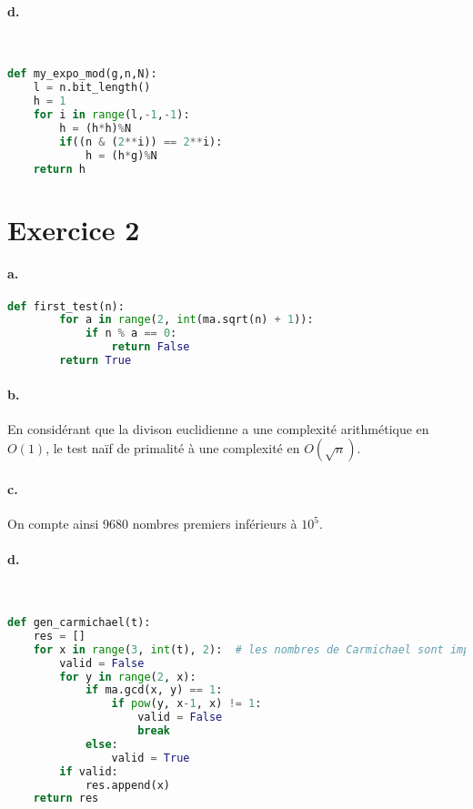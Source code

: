 \documentclass[french]{article}
\begin{document}
\paragraph{d.} \
\begin{lstlisting}[language=Python, belowskip=-1 \baselineskip]
def my_expo_mod(g,n,N):
    l = n.bit_length()
    h = 1
    for i in range(l,-1,-1):
        h = (h*h)%N
        if((n & (2**i)) == 2**i):
            h = (h*g)%N
    return h
\end{lstlisting}
\section*{Exercice 2}
\paragraph{a.}  
\begin{center}
\begin{lstlisting}[language=Python, belowskip=-1 \baselineskip]
    def first_test(n):
        for a in range(2, int(ma.sqrt(n) + 1)):
            if n % a == 0:
                return False
        return True
\end{lstlisting}
\end{center}
\paragraph{b.} En considérant que la divison euclidienne a une complexité arithmétique en $O(1)$, le test naïf de primalité à une complexité en $O(\sqrt{n})$.
\paragraph{c.} On compte ainsi 9680 nombres premiers inférieurs à $10^5$.

\paragraph{d.} \
\begin{lstlisting}[language=Python, belowskip=-1 \baselineskip]
def gen_carmichael(t):
    res = []
    for x in range(3, int(t), 2):  # les nombres de Carmichael sont impairs
        valid = False
        for y in range(2, x):
            if ma.gcd(x, y) == 1:
                if pow(y, x-1, x) != 1:
                    valid = False
                    break
            else:
                valid = True
        if valid:
            res.append(x)
    return res
\end{lstlisting}
\end{document}
